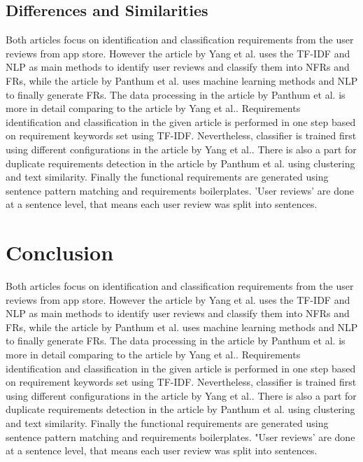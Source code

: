 \section{Differences and Similarities}
Both articles focus on identification and classification requirements from the user reviews from app store. However the article by Yang et al. uses the TF-IDF and NLP as main methods to identify user reviews and classify them into NFRs and FRs, while the article by Panthum et al. uses machine learning methods and NLP to finally generate FRs. The data processing in the article by Panthum et al. is more in detail comparing to the article by Yang et al.. Requirements identification and classification in the given article is performed in one step based on requirement keywords set using TF-IDF. Nevertheless, classifier is trained first using different configurations in the article by Yang et al.. There is also a part for duplicate requirements detection in the article by Panthum et al. using clustering and text similarity. Finally the functional requirements are generated using sentence pattern matching and requirements boilerplates. 'User reviews' are done at a sentence level, that means each user review was split into sentences.

\chapter{Conclusion} 
Both articles focus on identification and classification requirements from the user reviews from app store. However the article by Yang et al. uses the TF-IDF and NLP as main methods to identify user reviews and classify them into NFRs and FRs, while the article by Panthum et al. uses machine learning methods and NLP to finally generate FRs. The data processing in the article by Panthum et al. is more in detail comparing to the article by Yang et al.. Requirements identification and classification in the given article is performed in one step based on requirement keywords set using TF-IDF. Nevertheless, classifier is trained first using different configurations in the article by Yang et al.. There is also a part for duplicate requirements detection in the article by Panthum et al. using clustering and text similarity. Finally the functional requirements are generated using sentence pattern matching and requirements boilerplates. "User reviews' are done at a sentence level, that means each user review was split into sentences.





